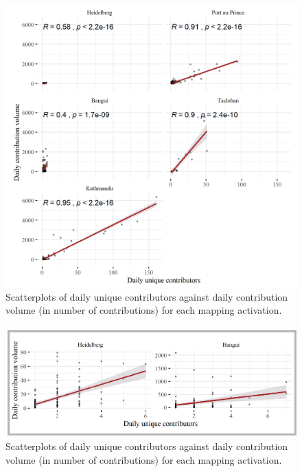 \begin{figure}[H] %
    \centering %
    \includegraphics[width = \textwidth]{Images/scatter.png} %
    \caption{Scatterplots of daily unique contributors against daily contribution volume (in number of contributions) for each mapping activation.} %
    \label{fig:scatter} %
\end{figure}

\begin{figure}[H] %
    \centering %
    \includegraphics[width = \textwidth]{Images/scatter_inset.png} %
    \caption{Scatterplots of daily unique contributors against daily contribution volume (in number of contributions) for each mapping activation.} %
    \label{fig:scatter_inset} %
\end{figure}

